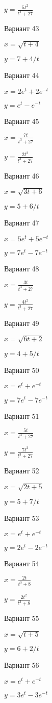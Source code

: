 \documentclass[11pt]{report}
\begin{document}
$y = \frac{5 t^{2}}{t^{3} + 27}$

Вариант 43

$x = \sqrt{t + 4}$

$y = 7 + 4 / t$

Вариант 44

$x = 2 e^{t} + 2 e^{- t}$

$y = e^{t} - e^{- t}$

Вариант 45

$x = \frac{7 t}{t^{3} + 27}$

$y = \frac{2 t^{2}}{t^{3} + 27}$

Вариант 46

$x = \sqrt{3 t + 6}$

$y = 5 + 6 / t$

Вариант 47

$x = 5 e^{t} + 5 e^{- t}$

$y = 7 e^{t} - 7 e^{- t}$

Вариант 48

$x = \frac{3 t}{t^{3} + 27}$

$y = \frac{4 t^{2}}{t^{3} + 27}$

Вариант 49

$x = \sqrt{6 t + 2}$

$y = 4 + 5 / t$

Вариант 50

$x = e^{t} + e^{- t}$

$y = 7 e^{t} - 7 e^{- t}$

Вариант 51

$x = \frac{5 t}{t^{3} + 27}$

$y = \frac{7 t^{2}}{t^{3} + 27}$

Вариант 52

$x = \sqrt{2 t + 5}$

$y = 5 + 7 / t$

Вариант 53

$x = e^{t} + e^{- t}$

$y = 2 e^{t} - 2 e^{- t}$

Вариант 54

$x = \frac{2 t}{t^{3} + 8}$

$y = \frac{2 t^{2}}{t^{3} + 8}$

Вариант 55

$x = \sqrt{t + 5}$

$y = 6 + 2 / t$

Вариант 56

$x = e^{t} + e^{- t}$

$y = 3 e^{t} - 3 e^{- t}$
\end{document}
